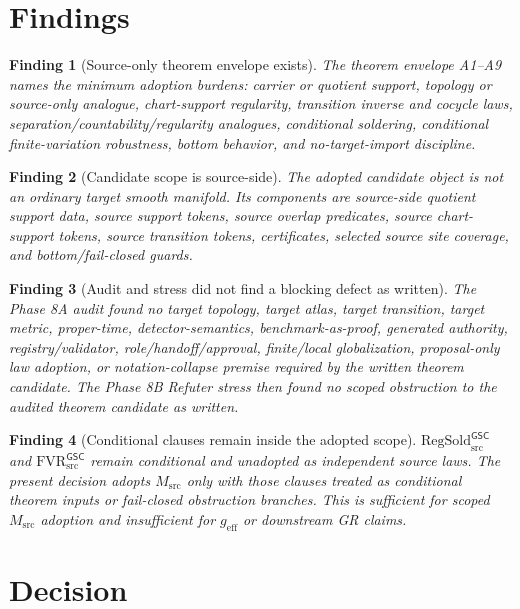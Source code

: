 \documentclass[11pt]{article}
\newcommand{\Msrc}{M_{\mathrm{src}}}
\newcommand{\RegSold}{\mathrm{RegSold}_{\mathrm{src}}^{\mathsf{GSC}}}
\newcommand{\FVR}{\mathrm{FVR}_{\mathrm{src}}^{\mathsf{GSC}}}
\newcommand{\geff}{g_{\mathrm{eff}}}
\newtheorem{finding}{Finding}
\begin{document}
\section{Findings}

\begin{finding}[Source-only theorem envelope exists]
The theorem envelope A1--A9 names the minimum adoption burdens: carrier or
quotient support, topology or source-only analogue, chart-support regularity,
transition inverse and cocycle laws, separation/countability/regularity
analogues, conditional soldering, conditional finite-variation robustness,
bottom behavior, and no-target-import discipline.
\end{finding}

\begin{finding}[Candidate scope is source-side]
The adopted candidate object is not an ordinary target smooth manifold. Its
components are source-side quotient support data, source support tokens,
source overlap predicates, source chart-support tokens, source transition
tokens, certificates, selected source site coverage, and bottom/fail-closed
guards.
\end{finding}

\begin{finding}[Audit and stress did not find a blocking defect as written]
The Phase 8A audit found no target topology, target atlas, target transition,
target metric, proper-time, detector-semantics, benchmark-as-proof, generated
authority, registry/validator, role/handoff/approval, finite/local
globalization, proposal-only law adoption, or notation-collapse premise
required by the written theorem candidate. The Phase 8B Refuter stress then
found no scoped obstruction to the audited theorem candidate as written.
\end{finding}

\begin{finding}[Conditional clauses remain inside the adopted scope]
\(\RegSold\) and \(\FVR\) remain conditional and unadopted as independent
source laws. The present decision adopts \(\Msrc\) only with those clauses
treated as conditional theorem inputs or fail-closed obstruction branches.
This is sufficient for scoped \(\Msrc\) adoption and insufficient for
\(\geff\) or downstream GR claims.
\end{finding}

\section{Decision}
\end{document}
